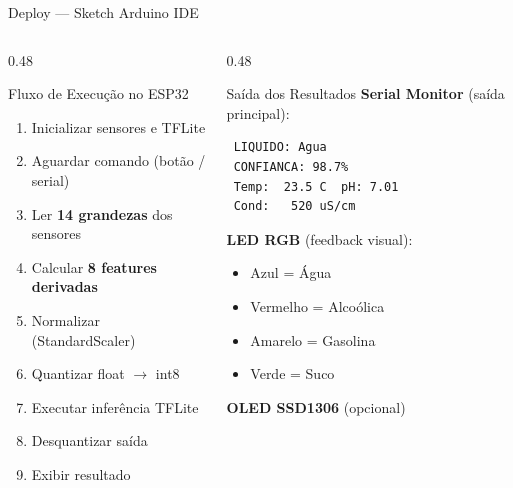 \documentclass[aspectratio=169, 11pt]{beamer}
\begin{document}
\begin{frame}[fragile]{Deploy — Sketch Arduino IDE}
  \begin{columns}[T]
    \begin{column}{0.48\textwidth}
      \begin{block}{Fluxo de Execução no ESP32}
        \begin{enumerate}
          \item Inicializar sensores e TFLite
          \item Aguardar comando (botão / serial)
          \item Ler \textbf{14 grandezas} dos sensores
          \item Calcular \textbf{8 features derivadas}
          \item Normalizar (StandardScaler)
          \item Quantizar float $\rightarrow$ int8
          \item Executar inferência TFLite
          \item Desquantizar saída
          \item Exibir resultado
        \end{enumerate}
      \end{block}
    \end{column}
    \begin{column}{0.48\textwidth}
      \begin{block}{Saída dos Resultados}
        \textbf{Serial Monitor} (saída principal):
        \begin{lstlisting}
 LIQUIDO: Agua
 CONFIANCA: 98.7%
 Temp:  23.5 C  pH: 7.01
 Cond:   520 uS/cm
        \end{lstlisting}
        \vspace{0.2cm}
        \textbf{LED RGB} (feedback visual):
        \begin{itemize}
          \item[\textcolor{blue}{\faCircle}] Azul = Água
          \item[\textcolor{red}{\faCircle}] Vermelho = Alcoólica
          \item[\textcolor{yellow!80!black}{\faCircle}] Amarelo = Gasolina
          \item[\textcolor{green!60!black}{\faCircle}] Verde = Suco
        \end{itemize}
        \vspace{0.2cm}
        \textbf{OLED SSD1306} (opcional)
      \end{block}
    \end{column}
  \end{columns}
\end{frame}
\end{document}
